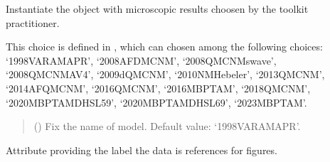 \documentclass[letterpaper,10pt,english]{sphinxmanual}
\begin{document}
\begin{fulllineitems}
\label{\detokenize{source/api/setup_micro:nucleardatapy.setup_micro.SetupMicro}}
\pysigstartsignatures
{}
\pysigstopsignatures
\sphinxAtStartPar
Instantiate the object with microscopic results choosen     by the toolkit practitioner.

\sphinxAtStartPar
This choice is defined in , which can chosen among     the following choices:     ‘1998\sphinxhyphen{}VAR\sphinxhyphen{}AM\sphinxhyphen{}APR’, ‘2008\sphinxhyphen{}AFDMC\sphinxhyphen{}NM’, ‘2008\sphinxhyphen{}QMC\sphinxhyphen{}NM\sphinxhyphen{}swave’,     ‘2008\sphinxhyphen{}QMC\sphinxhyphen{}NM\sphinxhyphen{}AV4’, ‘2009\sphinxhyphen{}dQMC\sphinxhyphen{}NM’, ‘2010\sphinxhyphen{}NM\sphinxhyphen{}Hebeler’,     ‘2013\sphinxhyphen{}QMC\sphinxhyphen{}NM’, ‘2014\sphinxhyphen{}AFQMC\sphinxhyphen{}NM’, ‘2016\sphinxhyphen{}QMC\sphinxhyphen{}NM’, ‘2016\sphinxhyphen{}MBPT\sphinxhyphen{}AM’,     ‘2018\sphinxhyphen{}QMC\sphinxhyphen{}NM’, ‘2020\sphinxhyphen{}MBPT\sphinxhyphen{}AM\sphinxhyphen{}DHSL59’, ‘2020\sphinxhyphen{}MBPT\sphinxhyphen{}AM\sphinxhyphen{}DHSL69’,     ‘2023\sphinxhyphen{}MBPT\sphinxhyphen{}AM’.
\begin{quote}\begin{description}
\sphinxAtStartPar
{} (\sphinxstyleliteralemphasis{\sphinxupquote{, }}) \textendash{} Fix the name of model. Default value: ‘1998\sphinxhyphen{}VAR\sphinxhyphen{}AM\sphinxhyphen{}APR’.

\end{description}\end{quote}

\sphinxAtStartPar
{}

\begin{fulllineitems}
\label{\detokenize{source/api/setup_micro:nucleardatapy.setup_micro.SetupMicro.label}}
\pysigstartsignatures
{}
\pysigstopsignatures
\sphinxAtStartPar
Attribute providing the label the data is references for figures.


\end{fulllineitems}
\end{fulllineitems}
\end{document}
